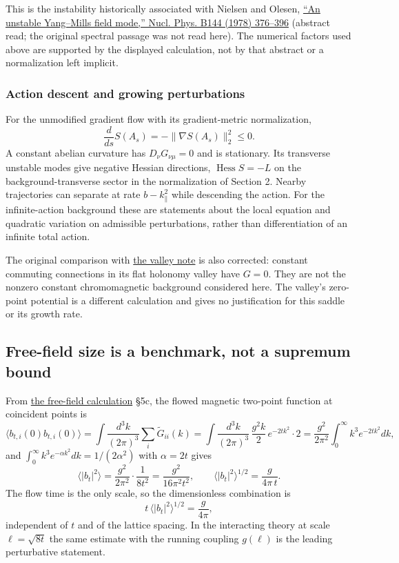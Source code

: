 \documentclass[11pt,a4paper]{article}
\begin{document}
This is the instability historically associated with Nielsen and Olesen,
\href{https://doi.org/10.1016/0550-3213(78)90377-2}{``An unstable
Yang--Mills field mode,'' Nucl. Phys. B144 (1978) 376--396} (abstract
read; the original spectral passage was not read here). The numerical
factors used above are supported by the displayed calculation, not by
that abstract or a normalization left implicit.

\hypertarget{action-descent-and-growing-perturbations}{%
\subsubsection{Action descent and growing
perturbations}\label{action-descent-and-growing-perturbations}}

For the unmodified gradient flow with its gradient-metric normalization,
\[\frac{d}{ds}S(A_s)=-\|\nabla S(A_s)\|_2^2\le0.\] A constant abelian
curvature has \(D_\nu G_{\nu\mu}=0\) and is stationary. Its transverse
unstable modes give negative Hessian directions,
\(\operatorname{Hess}S=-L\) on the background-transverse sector in the
normalization of Section 2. Nearby trajectories can separate at rate
\(b-k_\parallel^2\) while descending the action. For the infinite-action
background these are statements about the local equation and quadratic
variation on admissible perturbations, rather than differentiation of an
infinite total action.

The original comparison with \href{torus-valley-potential.md}{the valley
note} is also corrected: constant commuting connections in its flat
holonomy valley have \(G=0\). They are not the nonzero constant
chromomagnetic background considered here. The valley's zero-point
potential is a different calculation and gives no justification for this
saddle or its growth rate.

\hypertarget{free-field-size-is-a-benchmark-not-a-supremum-bound}{%
\subsection{Free-field size is a benchmark, not a supremum
bound}\label{free-field-size-is-a-benchmark-not-a-supremum-bound}}

From \href{finiteness-half-flowed-susceptibility.md}{the free-field
calculation} §5c, the flowed magnetic two-point function at coincident
points is \[\big\langle b_{t,i}(0)b_{t,i}(0)\big\rangle
=\int\!\frac{d^3k}{(2\pi)^3}\sum_i\tilde G_{ii}(k)
=\int\!\frac{d^3k}{(2\pi)^3}\,\frac{g^2k}{2}\,e^{-2tk^2}\cdot2
=\frac{g^2}{2\pi^2}\int_0^\infty\!k^3e^{-2tk^2}dk,\] and
\(\int_0^\infty k^3e^{-\alpha k^2}dk=1/(2\alpha^2)\) with \(\alpha=2t\)
gives
\[\big\langle|b_t|^2\big\rangle=\frac{g^2}{2\pi^2}\cdot\frac1{8t^2}=\frac{g^2}{16\pi^2t^2},
\qquad \big\langle|b_t|^2\big\rangle^{1/2}=\frac{g}{4\pi\,t}.\] The flow
time is the only scale, so the dimensionless combination is
\[t\,\big\langle|b_t|^2\big\rangle^{1/2}=\frac{g}{4\pi},\] independent
of \(t\) and of the lattice spacing. In the interacting theory at scale
\(\ell=\sqrt{8t}\) the same estimate with the running coupling
\(g(\ell)\) is the leading perturbative statement.
\end{document}
